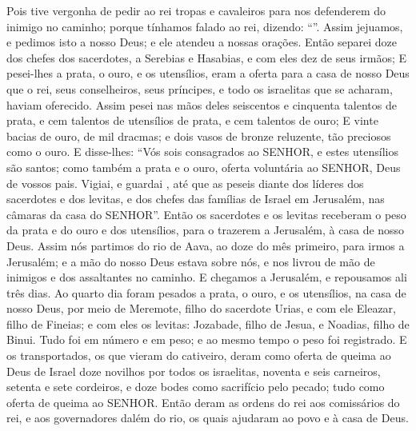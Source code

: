 {{  Pois tive vergonha de pedir ao rei tropas e cavaleiros para nos defenderem do inimigo no caminho; porque tínhamos falado ao rei, dizendo: \enquote{}.
  Assim jejuamos, e pedimos isto a nosso Deus; e ele atendeu a nossas orações.
  Então separei doze dos chefes dos sacerdotes, a Serebias e Hasabias, e com eles dez de seus irmãos;
  E pesei-lhes a prata, o ouro, e os utensílios, {} eram a oferta para a casa de nosso Deus que o rei, seus conselheiros, seus príncipes, e todo os israelitas que se acharam, haviam oferecido.
  Assim pesei nas mãos deles seiscentos e cinquenta talentos de prata, e cem talentos de utensílios de prata, e cem talentos de ouro;
  E vinte bacias de ouro, de mil dracmas; e dois vasos de bronze reluzente, tão preciosos como o ouro.
  E disse-lhes: \enquote{Vós sois consagrados ao SENHOR, e estes utensílios são santos; como também a prata e o ouro, {} oferta voluntária ao SENHOR, Deus de vossos pais.
  Vigiai, e guardai {}, até que as peseis diante dos líderes dos sacerdotes e dos levitas, e dos chefes das famílias de Israel em Jerusalém, nas câmaras da casa do SENHOR}.
  Então os sacerdotes e os levitas receberam o peso da prata e do ouro e dos utensílios, para o trazerem a Jerusalém, à casa de nosso Deus.
  Assim nós partimos do rio de Aava, ao {} doze do mês primeiro, para irmos a Jerusalém; e a mão do nosso Deus estava sobre nós, e nos livrou de mão de inimigos e dos assaltantes no caminho.
  E chegamos a Jerusalém, e repousamos ali três dias.
  Ao quarto dia foram pesados a prata, o ouro, e os utensílios, na casa de nosso Deus, por meio de Meremote, filho do sacerdote Urias, e com ele Eleazar, filho de Fineias; e com eles os levitas: Jozabade, filho de Jesua, e Noadias, filho de Binui.
  Tudo foi {} em número e em peso; e ao mesmo tempo o peso foi registrado.
  E os transportados, os que vieram do cativeiro, deram como oferta de queima ao Deus de Israel doze novilhos por todos os israelitas, noventa e seis carneiros, setenta e sete cordeiros, e doze bodes como sacrifício pelo pecado; tudo {} como oferta de queima ao SENHOR.
  Então deram as ordens do rei aos comissários do rei, e aos governadores dalém do rio, os quais ajudaram ao povo e à casa de Deus}.
\par }


